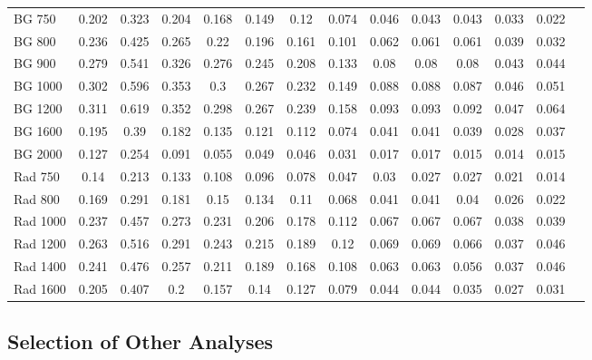 \begin{table}[h]
{\begin{tabular}{|l|c|c|c|c|c|c|c|c|c|c|c|c|c|}
BG 750 & 0.202 & 0.323 & 0.204 & 0.168 & 0.149 & 0.12 & 0.074 & 0.046 & 0.043 & 0.043 & 0.033 & 0.022\\
BG 800 & 0.236 & 0.425 & 0.265 & 0.22 & 0.196 & 0.161 & 0.101 & 0.062 & 0.061 & 0.061 & 0.039 &0.032\\
BG 900 & 0.279 & 0.541 & 0.326 & 0.276 & 0.245 & 0.208 & 0.133 & 0.08 & 0.08 & 0.08 & 0.043 &0.044\\
BG 1000 & 0.302 & 0.596 & 0.353 & 0.3 & 0.267 & 0.232 & 0.149 & 0.088 & 0.088 & 0.087 & 0.046 &0.051\\
BG 1200 & 0.311 & 0.619 & 0.352 & 0.298 & 0.267 & 0.239 & 0.158 & 0.093 & 0.093 & 0.092 & 0.047 &0.064\\
BG 1600 & 0.195 & 0.39 & 0.182 & 0.135 & 0.121 & 0.112 & 0.074 & 0.041 & 0.041 & 0.039 & 0.028 &0.037\\
BG 2000 & 0.127 & 0.254 & 0.091 & 0.055 & 0.049 & 0.046 & 0.031 & 0.017 & 0.017 & 0.015 & 0.014 &0.015\\ \hline
Rad 750 & 0.14 & 0.213 & 0.133 & 0.108 & 0.096 & 0.078 & 0.047 & 0.03 & 0.027 & 0.027 & 0.021 &0.014\\
Rad 800 & 0.169 & 0.291 & 0.181 & 0.15 & 0.134 & 0.11 & 0.068 & 0.041 & 0.041 & 0.04 & 0.026 &0.022\\
Rad 1000 & 0.237 & 0.457 & 0.273 & 0.231 & 0.206 & 0.178 & 0.112 & 0.067 & 0.067 & 0.067 & 0.038 &0.039\\
Rad 1200 & 0.263 & 0.516 & 0.291 & 0.243 & 0.215 & 0.189 & 0.12 & 0.069 & 0.069 & 0.066 & 0.037 & 0.046\\
Rad 1400 & 0.241 & 0.476 & 0.257 & 0.211 & 0.189 & 0.168 & 0.108 & 0.063 & 0.063 & 0.056 & 0.037 & 0.046 \\
Rad 1600 & 0.205 & 0.407 & 0.2 & 0.157 & 0.14 & 0.127 & 0.079 & 0.044 & 0.044 & 0.035 & 0.027 &0.031\\
\hline
\end{tabular}
}
\end{table}

\subsection{Selection of Other Analyses}

